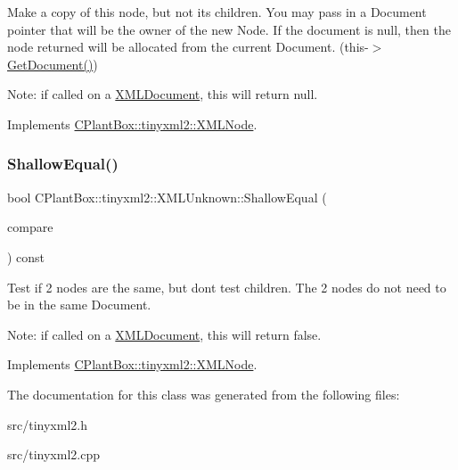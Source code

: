 Make a copy of this node, but not its children. You may pass in a Document pointer that will be the owner of the new Node. If the \textquotesingle{}document\textquotesingle{} is null, then the node returned will be allocated from the current Document. (this-\/$>$\hyperlink{classCPlantBox_1_1tinyxml2_1_1XMLNode_ac0d1a9be320497a51e7a202881a2352e}{Get\+Document()})

Note\+: if called on a \hyperlink{classCPlantBox_1_1tinyxml2_1_1XMLDocument}{X\+M\+L\+Document}, this will return null. 

Implements \hyperlink{classCPlantBox_1_1tinyxml2_1_1XMLNode_a8439e4e87206b26bc03427ffac3e882a}{C\+Plant\+Box\+::tinyxml2\+::\+X\+M\+L\+Node}.

\mbox{\label{classCPlantBox_1_1tinyxml2_1_1XMLUnknown_a22777b08f33f0e23c9e2f768a3fbd92f}} 
\subsubsection{\texorpdfstring{Shallow\+Equal()}{ShallowEqual()}}
{\footnotesize\ttfamily bool C\+Plant\+Box\+::tinyxml2\+::\+X\+M\+L\+Unknown\+::\+Shallow\+Equal (\begin{DoxyParamCaption}\item[{const \hyperlink{classCPlantBox_1_1tinyxml2_1_1XMLNode}{X\+M\+L\+Node} $\ast$}]{compare }\end{DoxyParamCaption}) const\hspace{0.3cm}{\ttfamily [virtual]}}

Test if 2 nodes are the same, but don\textquotesingle{}t test children. The 2 nodes do not need to be in the same Document.

Note\+: if called on a \hyperlink{classCPlantBox_1_1tinyxml2_1_1XMLDocument}{X\+M\+L\+Document}, this will return false. 

Implements \hyperlink{classCPlantBox_1_1tinyxml2_1_1XMLNode_a1019a06dab15152f06f3a879bf9a85c9}{C\+Plant\+Box\+::tinyxml2\+::\+X\+M\+L\+Node}.



The documentation for this class was generated from the following files\+:\begin{DoxyCompactItemize}
\item 
src/tinyxml2.\+h\item 
src/tinyxml2.\+cpp\end{DoxyCompactItemize}
